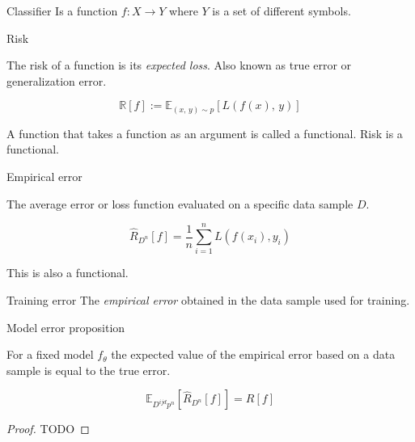 \begin{definition}{Classifier}{}
	Is a function \(f: X \longrightarrow Y\)
	where \(Y\) is a set of different symbols.
\end{definition}

\begin{definition}{Risk}{}

	The risk of a function is its \emph{expected loss}. Also known as true
	error or generalization error.

	\begin{equation*}
		\mathds{R}[f] := \mathds{E}_{(x,\, y) \sim p} \left[ L(f(x),\, y) \right]
	\end{equation*}

	\begin{note}
		A function that takes a function as an argument is called a functional.
		Risk is a functional.
	\end{note}
\end{definition}

\begin{definition}{Empirical error}{}

	The average error or loss function evaluated on a specific data sample
	\(D\).

	\begin{equation*}
		\hat{R}_{D^n}[f] = \frac{1}{n} \sum_{i=1}^n L(f(x_i), y_i)
	\end{equation*}

	\begin{note}
		This is also a functional.
	\end{note}
\end{definition}

\begin{definition}{Training error}{}
	The \emph{empirical error} obtained in the data
	sample used for training.
\end{definition}

\begin{prop}{Model error proposition}{}

	For a fixed model \(f_θ\) the expected value of the
	empirical error based on a data sample is equal to the true error.

	\begin{equation*}
		\mathds{E}_{D^{ijd}p^n}[\hat{R}_{D^n}[f]] = R[f]
	\end{equation*}

	\begin{proof} TODO
	\end{proof}
\end{prop}


